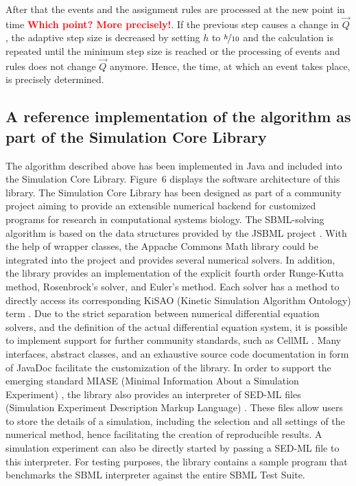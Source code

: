 \documentclass[10pt]{bmc_article}
\newenvironment{bmcformat}{\baselineskip20pt\sloppy\setboolean{publ}{false}}{\baselineskip20pt\sloppy}
\newcommand{\TODO}[1]{\textcolor{red}{\textbf{#1}}}
\begin{document}
\begin{bmcformat}
After that the events and the assignment rules are processed at the new point in time \TODO{Which point? More precisely!}.
If the previous step causes a change in $\vec{Q}$, the adaptive step size is decreased by setting $h$ to $\nicefrac{h}{10}$ and
the calculation is repeated until the minimum step size is reached or the processing of events and rules does not change $\vec{Q}$ anymore.
Hence, the time, at which an event takes place, is precisely determined.

\subsection*{A reference implementation of the algorithm as part of the Simulation Core Library}

The algorithm described above has been implemented in Java\texttrademark{} and included into the Simulation Core Library.
Figure~6 displays the software architecture of this library.
The Simulation Core Library has been designed as part of a community project aiming to provide an extensible numerical backend for customized programs for research in computational systems biology.
The SBML-solving algorithm is based on the data structures provided by the JSBML project \cite{Draeger2008}.
With the help of wrapper classes, the Appache Commons Math library could be integrated into the project and provides several numerical solvers.
In addition, the library provides an implementation of the explicit fourth order Runge-Kutta method, Rosenbrock's solver, and Euler's method.
Each solver has a method to directly access its corresponding KiSAO (Kinetic Simulation Algorithm Ontology) term \cite{Courtot2011}.
Due to the strict separation between numerical differential equation solvers, and the definition of the actual differential equation system, it is possible to implement support for further community standards, such as CellML \cite{Lloyd2004}.
Many interfaces, abstract classes, and an exhaustive source code documentation in form of JavaDoc facilitate the customization of the library.
In order to support the emerging standard MIASE (Minimal Information About a Simulation Experiment) \cite{Waltemath2011a}, the library also provides an interpreter of SED-ML files (Simulation Experiment Description Markup Language) \cite{Waltemath2011}.
These files allow users to store the details of a simulation, including the selection and all settings of the numerical method, hence facilitating the creation of reproducible results.
A simulation experiment can also be directly started by passing a SED-ML file to this interpreter.
For testing purposes, the library contains a sample program that benchmarks the SBML interpreter against the entire SBML Test Suite.



\end{bmcformat}
\end{document}

